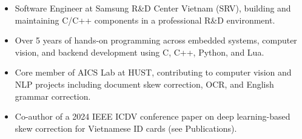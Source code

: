 
\begin{cvparagraph}
  \begin{itemize}
    \item {Software Engineer at Samsung R\&D Center Vietnam (SRV), building and maintaining C/C++ components in a professional R\&D environment.}
    \item {Over 5 years of hands-on programming across embedded systems, computer vision, and backend development using C, C++, Python, and Lua.}
    \item {Core member of AICS Lab at HUST, contributing to computer vision and NLP projects including document skew correction, OCR, and English grammar correction.}
    \item {Co-author of a 2024 IEEE ICDV conference paper on deep learning-based skew correction for Vietnamese ID cards (see Publications).}
  \end{itemize}



\end{cvparagraph}
